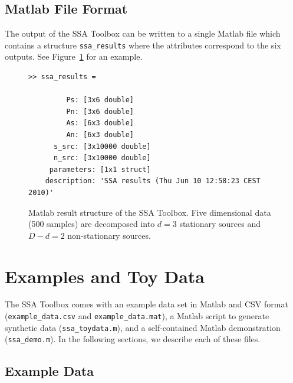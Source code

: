 \documentclass{article}
\newcommand{\1}{\ensuremath{\mathds{1}}}
\newcommand{\0}{\ensuremath{0}}
\begin{document}
\subsection{Matlab File Format}

The output of the SSA Toolbox can be written to a single Matlab file which contains
a structure \texttt{ssa\_results} where the attributes correspond to the six outputs. 
See Figure~\ref{fig:ex_matlab_res} for an example.

\begin{figure}[h]
\centering
\begin{boxedminipage}{12cm}
\begin{verbatim}
>> ssa_results = 

         Ps: [3x6 double]
         Pn: [3x6 double]
         As: [6x3 double]
         An: [6x3 double]
      s_src: [3x10000 double]
      n_src: [3x10000 double]
     parameters: [1x1 struct]
    description: 'SSA results (Thu Jun 10 12:58:23 CEST 2010)'
\end{verbatim}
\end{boxedminipage}
\caption{
Matlab result structure of the SSA Toolbox. Five dimensional data (500 samples) 
are decomposed into $d = 3$ stationary sources and $D-d = 2$ non-stationary sources.
\label{fig:ex_matlab_res}
}
\end{figure}

\FloatBarrier %

\section{Examples and Toy Data}

The SSA Toolbox comes with an example data set in Matlab and CSV format (\texttt{example\_data.csv} and \texttt{example\_data.mat}), a Matlab script to generate synthetic data (\texttt{ssa\_toydata.m}), and a self-contained 
Matlab demonstration (\texttt{ssa\_demo.m}). In the 
following sections, we describe each of these files.

\subsection{Example Data}
\end{document}
